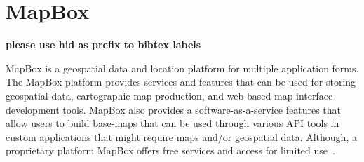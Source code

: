 \section{MapBox}

{\bf please use  hid as prefix to bibtex labels}

MapBox is a geospatial data and location platform for multiple application
forms.  The MapBox platform provides services and features that can be used for
storing geospatial data, cartographic map production, and web-based map
interface development tools.  MapBox also provides a software-as-a-service
features that allow users to build base-maps that can be used through various
API tools in custom applications that might require maps and/or geospatial
data.  Although, a proprietary platform MapBox offers free services and access
for limited use~\cite{MapBox2018}.
